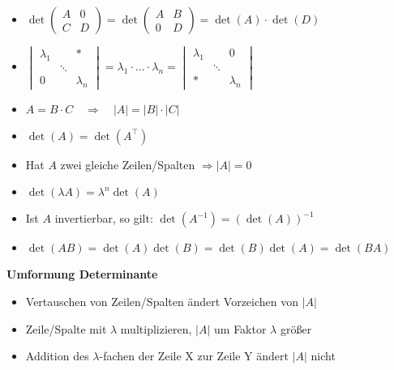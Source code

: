 \documentclass[german, 6pt]{latex4ei/latex4ei_sheet}
\begin{document}
\begin{itemize}
\[\begin{tikzpicture}[baseline=(current bounding box.center), scale=0.5]
    \draw[thin, red] (m-1-1.north west) -- (m-3-3.south east);
    \draw[thin, red] (m-1-2.north west) -- (extended-3-1.south east);
    \draw[thin, red] (m-1-3.north west) -- (extended-3-2.south east);
    \draw[thin, blue] (m-1-3.north east) -- (m-3-1.south west);
    \draw[thin, blue] (extended-1-1.north east) -- (m-3-2.south west);
    \draw[thin, blue] (extended-1-2.north east) -- (m-3-3.south west);
\end{tikzpicture}
\]
$=a_{11}a_{22}a_{33}+a_{12}a_{23}a_{31}+a_{13}a_{21}a_{32}-a_{12}a_{21}a_{33}-a_{11}a_{23}a_{32}-a_{13}a_{22}a_{31}$
\item $\det\begin{pmatrix}A&0\\C&D\end{pmatrix}=\det\begin{pmatrix}A&B\\0&D\end{pmatrix}=\det(A)\cdot\det(D)$
\item $\begin{vmatrix}\lambda_1&&* \\ &\ddots& \\ 0&&\lambda_n \end{vmatrix} = \lambda_1\cdot \ldots\cdot \lambda_n = \begin{vmatrix} \lambda_1&&0  \\  &\ddots& \\  *&&\lambda_n \end{vmatrix}$
\item $A=B \cdot C \quad \Rightarrow \quad |A|=|B| \cdot |C|$
\item $\det(A)=\det(A^\top)$
\item Hat $A$ zwei gleiche Zeilen/Spalten $\Rightarrow |A|=0$
\item $\det(\lambda A)=\lambda^n \det(A)$
\item Ist $A$ invertierbar, so gilt: $\det(A^{-1})=(\det(A))^{-1}$
\item $\det(AB) = \det(A) \det(B) = \det(B) \det(A) = \det(BA)$
\end{itemize}
\textbf{Umformung Determinante}
\begin{itemize}\itemsep0pt
\item Vertauschen von Zeilen/Spalten ändert Vorzeichen von $|A|$
\item Zeile/Spalte mit $\lambda$ multiplizieren, $|A|$ um Faktor $\lambda$ größer
\item Addition des $\lambda$-fachen der Zeile X zur Zeile Y ändert $|A|$ nicht 
\end{itemize}
\end{document}
